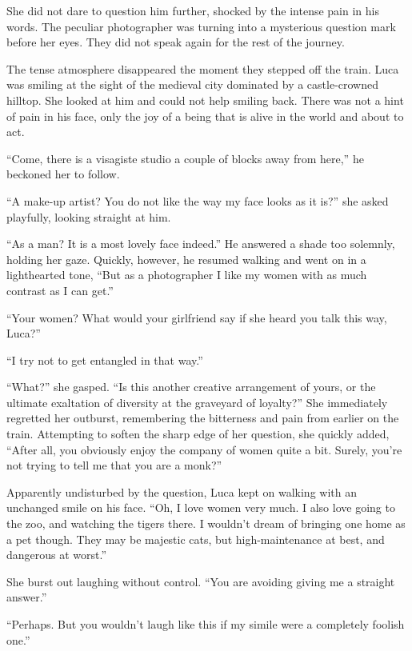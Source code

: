 She did not dare to question him further, shocked by the intense pain in his words. The peculiar photographer was turning into a mysterious question mark before her eyes. They did not speak again for the rest of the journey.

\sectionline

The tense atmosphere disappeared the moment they stepped off the train. Luca was smiling at the sight of the medieval city dominated by a castle-crowned hilltop. She looked at him and could not help smiling back. There was not a hint of pain in his face, only the joy of a being that is alive in the world and about to act.

``Come, there is a visagiste studio a couple of blocks away from here,'' he beckoned her to follow.

``A make-up artist? You do not like the way my face looks as it is?'' she asked playfully, looking straight at him.

``As a man? It is a most lovely face indeed.'' He answered a shade too solemnly, holding her gaze. Quickly, however, he resumed walking and went on in a lighthearted tone, ``But as a photographer I like my women with as much contrast as I can get.''

``Your women? What would your girlfriend say if she heard you talk this way, Luca?''

``I try not to get entangled in that way.''

``What?'' she gasped. ``Is this another creative arrangement of yours, or the ultimate exaltation of diversity at the graveyard of loyalty?'' She immediately regretted her outburst, remembering the bitterness and pain from earlier on the train. Attempting to soften the sharp edge of her question, she quickly added, ``After all, you obviously enjoy the company of women quite a bit. Surely, you're not trying to tell me that you are a monk?''

Apparently undisturbed by the question, Luca kept on walking with an unchanged smile on his face. ``Oh, I love women very much. I also love going to the zoo, and watching the tigers there. I wouldn't dream of bringing one home as a pet though. They may be majestic cats, but high-maintenance at best, and dangerous at worst.''

She burst out laughing without control. ``You are avoiding giving me a straight answer.''

``Perhaps. But you wouldn't laugh like this if my simile were a completely foolish one.''

